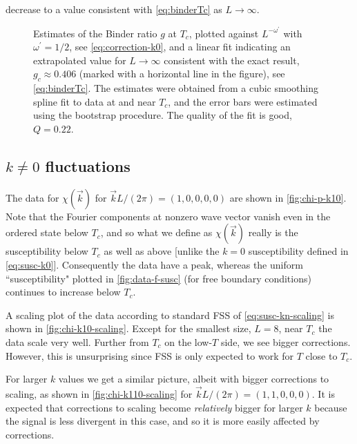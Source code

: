 decrease to a value consistent with \cref{eq:binderTc} as $L\to\infty$.
\begin{figure}
  \centering
  
  \caption[
    Data for the Binder ratio $g$ at the transition temperature $T_c$ for the
    five-dimensional Ising model with periodic boundary conditions.
  ]
  {
    Estimates of the Binder ratio $g$ at $T_c$, plotted against
    $L^{-\omega^{\prime}}$ with $\omega^{\prime}=1/2$, see
    \cref{eq:correction-k0}, and a linear fit indicating an extrapolated
    value for $L\to\infty$ consistent with the exact result, $g_c \approx
    0.406$ (marked with a horizontal line in the figure), see
    \cref{eq:binderTc}. The estimates were obtained from a cubic smoothing
    spline fit to data at and near $T_c$, and the error bars were estimated
    using the bootstrap procedure. The quality of the fit is good, $Q=0.22$.
  } \label{fig:gx}
\end{figure}


\subsection{$k \neq 0$ fluctuations}

The data for $\chi(\vec{k})$ for $\vec{k}L/(2\pi)=(1,0,0,0,0)$ are shown in
\cref{fig:chi-p-k10}. Note that the Fourier components at nonzero wave vector
vanish even in the ordered state below $T_c$, and so what we define as
$\chi(\vec{k})$ really is the susceptibility below $T_c$ as well as above
[unlike the $k=0$ susceptibility defined in \cref{eq:susc-k0}]. Consequently
the data have a peak, whereas the uniform ``susceptibility" plotted in
\cref{fig:data-f-susc} (for free boundary conditions) continues to increase
below $T_c$.

A scaling plot of the data according to standard FSS of
\cref{eq:susc-kn-scaling} is shown in \cref{fig:chi-k10-scaling}. Except for
the smallest size, $L=8$, near $T_c$ the data scale very well. Further from
$T_c$ on the low-$T$ side, we see bigger corrections. However, this is
unsurprising since FSS is only expected to work for $T$ close to $T_c$.

For larger $k$ values we get a similar picture, albeit with bigger corrections
to scaling, as shown in \cref{fig:chi-k110-scaling} for
$\vec{k}L/(2\pi)=(1,1,0,0,0)$. It is expected that corrections to scaling
become \emph{relatively} bigger for larger $k$ because the signal is less
divergent in this case, and so it is more easily affected by corrections.

